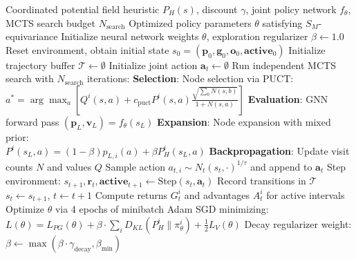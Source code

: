 \documentclass[11pt,a4paper]{article}
\begin{document}
\begin{algorithm}[htbp]
\caption{Decentralized Permutation-Equivariant MCTS MARL Training}
\label{alg:marl_training}
\begin{algorithmic}[1]
\REQUIRE Coordinated potential field heuristic $P_H(s)$, discount $\gamma$, joint policy network $f_\theta$, MCTS search budget $N_{\mathrm{search}}$
\ENSURE Optimized policy parameters $\theta$ satisfying $S_M$-equivariance
\STATE Initialize neural network weights $\theta$, exploration regularizer $\beta \leftarrow 1.0$
    \STATE Reset environment, obtain initial state $s_0 = (\mathbf{p}_0, \mathbf{g}_0, \mathbf{o}_0, \mathbf{active}_0)$
    \STATE Initialize trajectory buffer $\mathcal{T} \leftarrow \emptyset$
        \STATE Initialize joint action $\mathbf{a}_t \leftarrow \emptyset$
            \STATE Run independent MCTS search with $N_{\mathrm{search}}$ iterations:
                \STATE \textbf{Selection}: Node selection via PUCT: \\
                $a^* = \arg\max_a [Q^i(s, a) + c_{\mathrm{puct}} P^i(s, a) \frac{\sqrt{\sum_b N(s, b)}}{1 + N(s, a)}]$
                \STATE \textbf{Evaluation}: GNN forward pass $(\mathbf{p}_L, \mathbf{v}_L) = f_\theta(s_L)$
                \STATE \textbf{Expansion}: Node expansion with mixed prior: \\
                $P^i(s_L, a) = (1 - \beta) p_{L, i}(a) + \beta P_H^i(s_L, a)$
                \STATE \textbf{Backpropagation}: Update visit counts $N$ and values $Q$
            \ENDFOR
            \STATE Sample action $a_{t, i} \sim N_t(s_t, \cdot)^{1/\tau}$ and append to $\mathbf{a}_t$
        \ENDFOR
        \STATE Step environment: $s_{t+1}, \mathbf{r}_t, \mathbf{active}_{t+1} \leftarrow \mathrm{Step}(s_t, \mathbf{a}_t)$
        \STATE Record transitions in $\mathcal{T}$
        \STATE $s_t \leftarrow s_{t+1}$, $t \leftarrow t + 1$
    \ENDWHILE
    \STATE Compute returns $G_t^i$ and advantages $A_t^i$ for active intervals
    \STATE Optimize $\theta$ via 4 epochs of minibatch Adam SGD minimizing: \\
    $L(\theta) = L_{PG}(\theta) + \beta \cdot \sum_i D_{KL}(P_H^i \parallel \pi_\theta^i) + \frac{1}{2} L_V(\theta)$
    \STATE Decay regularizer weight: $\beta \leftarrow \max(\beta \cdot \gamma_{\mathrm{decay}}, \beta_{\min})$
\ENDFOR
\end{algorithmic}
\end{algorithm}
\end{document}
